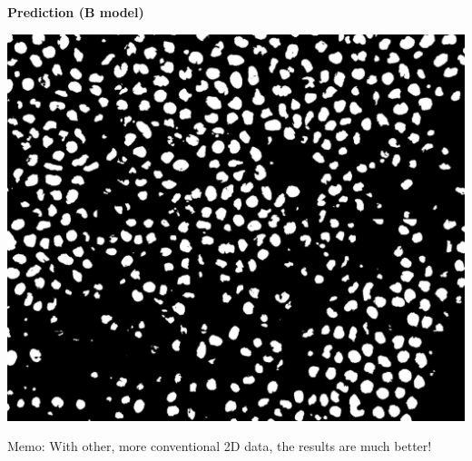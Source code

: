 \begin{frame}
\begin{minipage}[h!]{0.30\textwidth}
  \end{minipage}\hfill
  \begin{minipage}[h!]{0.30\textwidth}
    \centering
    \textbf{Prediction (B model)}\par\medskip
    \includegraphics[scale=0.1]{./img/result_pred_bio.png}
  \end{minipage}

  \medskip
  Memo: With other, more conventional 2D data, the results are much better!

\end{frame}